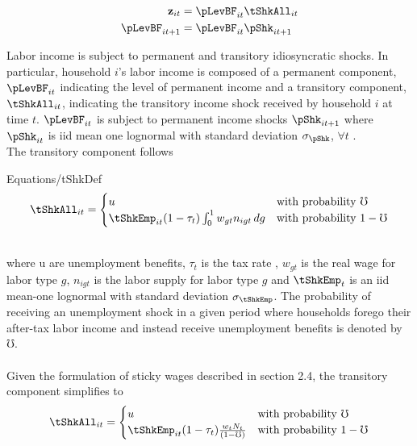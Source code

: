 \documentclass[titlepage]{\econtex}\providecommand{\texname}{FBS-NK}
\providecommand{\EqDir}{Equations}
\begin{document}
\begin{align*}
\mathbf{z}_{it} &= \pLevBF_{it}\tShkAll_{it} \\
\pLevBF_{it+1} &=\pLevBF_{it} \pShk_{it+1} \\
\end{align*}


Labor income is subject to permanent and transitory idiosyncratic shocks. In particular, household $i$'s labor income is composed of a permanent component, $\pLevBF_{it} $ indicating the level of permanent income and a transitory component, $\tShkAll_{it} $, indicating the transitory income shock received by household $i$ at time $t$. $\pLevBF_{it} $ is subject to permanent income shocks $\pShk_{it+1}$ where $\pShk_{it}$ is iid mean one lognormal with standard deviation $\sigma_\pShk$, $\forall t$ . \\



The transitory component follows   \\
\begin{verbatimwrite}{\EqDir/tShkDef}
$$
\tShkAll _{it}=
\begin{cases}
 u \phantom{_{t+1}/\pNotZero} & \text{with probability $\mho $} \\
 \tShkEmp_{it} (1-\tau_{t})\int_{0}^{1} w_{gt}n_{igt} \, dg      & \text{with probability $1 - \mho  $} 
\end{cases} \label{eq:tShkDef}
$$
\end{verbatimwrite}
\\
where u are unemployment benefits, $\tau_{t}$ is the tax rate , $w_{gt}$ is the real wage for labor type $g$, $ n_{igt}$ is the labor supply for labor type $g$ and $\tShkEmp_{t}$ is an iid mean-one lognormal with standard deviation $\sigma_{\tShkEmp}$.  The probability of receiving an unemployment shock in a given period where households forego their after-tax labor income and instead receive unemployment benefits is denoted by $\mho$.  \\ \\

Given the formulation of sticky wages described in section 2.4, the transitory component simplifies to \\

\begin{equation}
\tShkAll _{it}=
\begin{cases}
 u \phantom{_{t+1}/\pNotZero} & \text{with probability $\mho $} \\
 \tShkEmp_{it} (1-\tau_{t})\frac{w_{t}N_{t}}{(1-\mho)}      & \text{with probability $1 - \mho  $} 
\end{cases} \label{eq:tShkDef}
\end{equation} 
\end{document}
